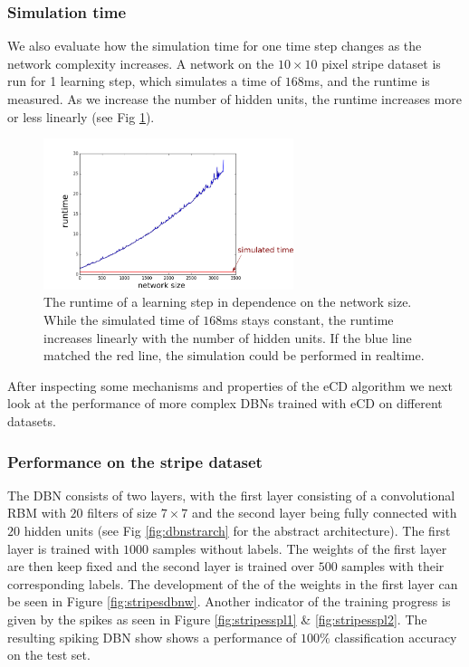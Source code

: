 \subsubsection{Simulation time} \label{c:simtimeexp}

We also evaluate how the simulation time for one time step changes as the network complexity increases.
A network on the $10 \times 10$ pixel stripe dataset is run for 1 learning step, which simulates a time of $168$ms, and the runtime is measured.
As we increase the number of hidden units, the runtime increases more or less linearly (see Fig \ref{fig:simtime}).

\begin{figure}[h!]
	\centering
    	\includegraphics[width=0.65\textwidth]{imgs/runtime-1.png} 
    \caption[The runtime of a learning step in dependence on the network size.]{The runtime of a learning step in dependence on the network size. While the simulated time of $168$ms stays constant, the runtime increases linearly with the number of hidden units. If the blue line matched the red line, the simulation could be performed in realtime.}
	\label{fig:simtime}
\end{figure}

After inspecting some mechanisms and properties of the eCD algorithm we next look at the performance of more complex DBNs trained with eCD on different datasets.

\subsubsection{Performance on the stripe dataset} \label{c:stripeexp}

The DBN consists of two layers, with the first layer consisting of a convolutional RBM with $20$ filters of size $7 \times 7$ and the second layer being fully connected with $20$ hidden units (see Fig \ref{fig:dbnstrarch} for the abstract architecture).
The first layer is trained with $1000$ samples without labels.
The weights of the first layer are then keep fixed and the second layer is trained over $500$ samples with their corresponding labels.
The development of the of the weights in the first layer can be seen in Figure \ref{fig:stripesdbnw}.
Another indicator of the training progress is given by the spikes as seen in Figure \ref{fig:stripesspl1} \& \ref{fig:stripesspl2}.
The resulting spiking DBN show shows a performance of $100 \%$ classification accuracy on the test set. 

